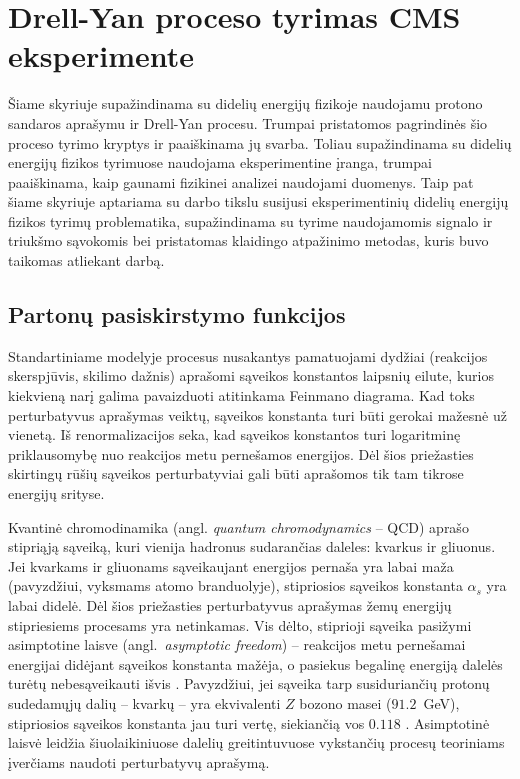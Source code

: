 \documentclass[a4paper, 12pt, oneside]{article}
\newlength\q
\begin{document}
\section{Drell-Yan proceso tyrimas CMS eksperimente}
Šiame skyriuje supažindinama su didelių energijų fizikoje naudojamu protono sandaros aprašymu ir Drell-Yan procesu.
Trumpai pristatomos pagrindinės šio proceso tyrimo kryptys ir paaiškinama jų svarba.
Toliau supažindinama su didelių energijų fizikos tyrimuose naudojama eksperimentine įranga, trumpai paaiškinama,
kaip gaunami fizikinei analizei naudojami duomenys.
Taip pat šiame skyriuje aptariama su darbo tikslu susijusi eksperimentinių didelių energijų fizikos tyrimų problematika,
supažindinama su tyrime naudojamomis signalo ir triukšmo sąvokomis bei pristatomas klaidingo atpažinimo metodas,
kuris buvo taikomas atliekant darbą.

\subsection{Partonų pasiskirstymo funkcijos}
Standartiniame modelyje procesus nusakantys pamatuojami dydžiai (reakcijos skerspjūvis, skilimo dažnis) aprašomi sąveikos
konstantos laipsnių eilute, kurios kiekvieną narį galima pavaizduoti atitinkama Feinmano diagrama.
Kad toks perturbatyvus aprašymas veiktų, sąveikos konstanta turi būti gerokai mažesnė už vienetą.
Iš renormalizacijos seka, kad sąveikos konstantos turi logaritminę priklausomybę nuo reakcijos metu pernešamos energijos.
Dėl šios priežasties skirtingų rūšių sąveikos perturbatyviai gali būti aprašomos tik tam tikrose energijų srityse\cite{QCDalpha}.

Kvantinė chromodinamika (angl. \textit{quantum chromodynamics} -- QCD) aprašo stipriąją sąveiką, kuri vienija hadronus
sudarančias daleles: kvarkus ir gliuonus.
Jei kvarkams ir gliuonams sąveikaujant energijos pernaša yra labai maža (pavyzdžiui, vyksmams atomo branduolyje),
stipriosios sąveikos konstanta $\alpha_s$ yra labai didelė.
Dėl šios priežasties perturbatyvus aprašymas žemų energijų stipriesiems procesams yra netinkamas.
Vis dėlto, stiprioji sąveika pasižymi asimptotine laisve (angl.\ \textit{asymptotic freedom}) -- reakcijos metu pernešamai
energijai didėjant sąveikos konstanta mažėja, o pasiekus begalinę energiją dalelės turėtų nebesąveikauti išvis \cite{AFreedom}.
Pavyzdžiui, jei sąveika tarp susiduriančių protonų sudedamųjų dalių -- kvarkų -- yra ekvivalenti $Z$ bozono masei ($91.2$~GeV),
stipriosios sąveikos konstanta jau turi vertę, siekiančią vos $0.118$ \cite{PDGreview}.
Asimptotinė laisvė leidžia šiuolaikiniuose dalelių greitintuvuose vykstančių procesų teoriniams įverčiams naudoti
perturbatyvų aprašymą.
\end{document}
